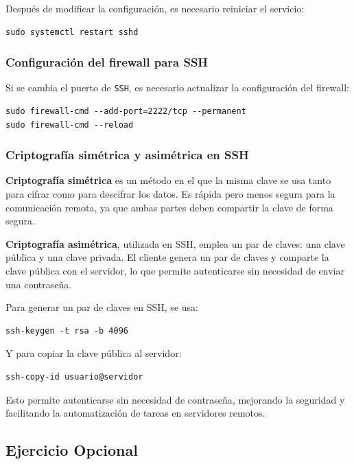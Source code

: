 Después de modificar la configuración, es necesario reiniciar el servicio:

\begin{lstlisting}[style=mystyle]
sudo systemctl restart sshd
\end{lstlisting}

\subsubsection{Configuración del firewall para SSH}
Si se cambia el puerto de \texttt{SSH}, es necesario actualizar la configuración del firewall:

\begin{lstlisting}[style=mystyle]
sudo firewall-cmd --add-port=2222/tcp --permanent
sudo firewall-cmd --reload
\end{lstlisting}

\subsubsection{Criptografía simétrica y asimétrica en SSH}
\textbf{Criptografía simétrica} es un método en el que la misma clave se usa tanto para cifrar como para descifrar los datos. Es rápida pero menos segura para la comunicación remota, ya que ambas partes deben compartir la clave de forma segura.

\textbf{Criptografía asimétrica}, utilizada en SSH, emplea un par de claves: una clave pública y una clave privada. El cliente genera un par de claves y comparte la clave pública con el servidor, lo que permite autenticarse sin necesidad de enviar una contraseña.

Para generar un par de claves en SSH, se usa:

\begin{lstlisting}[style=mystyle]
ssh-keygen -t rsa -b 4096
\end{lstlisting}

Y para copiar la clave pública al servidor:

\begin{lstlisting}[style=mystyle]
ssh-copy-id usuario@servidor
\end{lstlisting}

Esto permite autenticarse sin necesidad de contraseña, mejorando la seguridad y facilitando la automatización de tareas en servidores remotos.

\subsection{Ejercicio Opcional}


